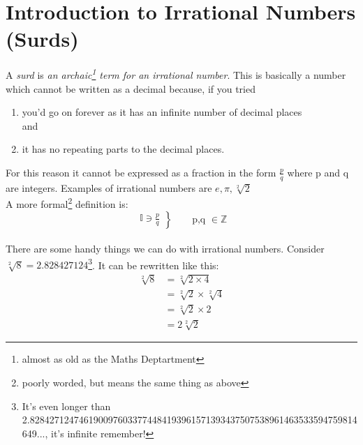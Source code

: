\section{Introduction to Irrational Numbers (Surds)}
\label{sec:IntroductionToIrrationalNumbers}
A \emph{surd} is \emph{an archaic\footnote{almost as old as the Maths
Deptartment} term for an irrational number}. This is basically a number which
cannot be written as a decimal because, if you tried
\begin{enumerate}
  \item you'd go on forever as it has an infinite number of decimal places\\
  and
  \item it has no repeating parts to the decimal places.
\end{enumerate}
For this reason it cannot be expressed as a fraction in the form $\frac{p}{q}$
where p and q are integers.
Examples of irrational numbers are $e, \pi, \sqrt[2]{2}$
\\
A more formal\footnote{poorly worded, but means the same thing as above}
definition is:
\begin{equation*}
\left.\begin{aligned}
  \mathbb{I} \ni \frac{p}{q}
\end{aligned}
\right\} 
\qquad \text{{p,q $\in \mathbb{Z}$}}
\end{equation*}
\\
There are some handy things we can do with irrational numbers. Consider
$\sqrt[2]{8} =
2.828427124$\footnote{It's even longer than
2.8284271247461900976033774484193961571393437507538961463533594759814649...,
it's infinite remember!}. It can be rewritten like this:
\begin{align}
  \sqrt[2]{8} & = 
    \sqrt[2]{2 \times 4} \\
    & = \sqrt[2]{2} \times \sqrt[2]{4} \\
    & = \sqrt[2]{2} \times 2 \\
    & = 2\sqrt[2]{2}
\end{align}

